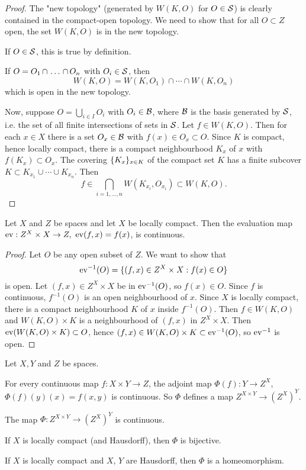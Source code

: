 \begin{proof}
The "new topology" (generated by $W(K,O)$ for $O\in\S$) is clearly contained in the compact-open topology. We need to show that for all $O\subset Z$ open, the set $W(K,O)$ is in the new topology.

If $O\in\S$, this is true by definition.

If $O=\nns{O}{\cap}{n}$ with $O_i\in\S$, then
\[W(K,O)=W(K,O_1)\cap\cdots\cap W(K,O_n)\]
which is open in the new topology.

Now, suppose $O=\bigcup_{i\in I}O_i$ with $O_i\in\Bb$, where $\Bb$ is the basis generated by $\S$, i.e. the set of all finite intersections of sets in $\S$. Let $f\in W(K,O)$. Then for each $x\in X$ there is a set $O_x\in\Bb$ with $f(x)\in O_x\subset O$. Since $K$ is compact, hence locally compact, there is a compact neighbourhood $K_x$ of $x$ with $f(K_x)\subset O_x$. The covering $\cb{K_x}_{x\in K}$ of the compact set $K$ has a finite subcover $K\subset K_{x_1}\cup\cdots\cup K_{x_n}$. Then
\[f\in \bigcap_{i=1,\dots,n}W(K_{x_i},O_{x_i})\subset W(K,O).\]
\end{proof}

\begin{theorem}
Let $X$ and $Z$ be spaces and let $X$ be locally compact. Then the evaluation map $\ev:Z^X\times X\to Z,\ \ev(f,x)=f(x)$, is continuous.
\end{theorem}

\begin{proof}
Let $O$ be any open subset of $Z$. We want to show that
\[\ev^{-1}(O)=\cb{(f,x)\in Z^X\times X:f(x)\in O}\]
is open. Let $(f,x)\in Z^X\times X$ be in $\ev^{-1}(O)$, so $f(x)\in O$. Since $f$ is continuous, $f^{-1}(O)$ is an open neighbourhood of $x$. Since $X$ is locally compact, there is a compact neighbourhood $K$ of $x$ inside $f^{-1}(O)$. Then $f\in W(K,O)$ and $W(K,O)\times K$ is a neighbourhood of $(f,x)$ in $Z^X\times X$. Then $\ev(W(K,O)\times K)\subset O$, hence $(f,x)\in W(K,O)\times K\subset\ev^{-1}(O)$, so $\ev^{-1}$ is open.
\end{proof}

\begin{theorem}
Let $X,Y$ and $Z$ be spaces.
\begin{numerate}
    \setcounter{enumi}{-1}
    \item For every continuous map $f:X\times Y\to Z$, the adjoint map $\Phi(f):Y\to Z^X$, $\Phi(f)(y)(x)=f(x,y)$ is continuous. So $\Phi$ defines a map $Z^{X\times Y}\to(Z^X)^Y$.
    \item The map $\Phi:Z^{X\times Y}\to(Z^X)^Y$ is continuous.
    \item If $X$ is locally compact (and Hausdorff), then $\Phi$ is bijective.
    \item If $X$ is locally compact and $X$, $Y$ are Hausdorff, then $\Phi$ is a homeomorphism.
\end{numerate}
\end{theorem}

